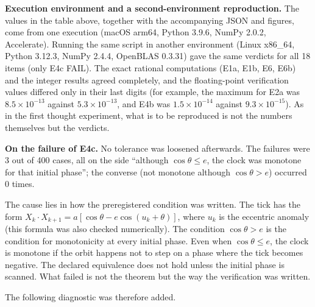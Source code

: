 \documentclass[
  a4paper,
]{article}
\begin{document}
\textbf{Execution environment and a second-environment reproduction.}
The values in the table above, together with the accompanying JSON and
figures, come from one execution (macOS arm64, Python 3.9.6, NumPy
2.0.2, Accelerate). Running the same script in another environment
(Linux x86\_64, Python 3.12.3, NumPy 2.4.4, OpenBLAS 0.3.31) gave the
same verdicts for all 18 items (only E4c FAIL). The exact rational
computations (E1a, E1b, E6, E6b) and the integer results agreed
completely, and the floating-point verification values differed only in
their last digits (for example, the maximum for E2a was
\(8.5\times10^{-13}\) against \(5.3\times10^{-13}\), and E4b was
\(1.5\times10^{-14}\) against \(9.3\times10^{-15}\)). As in the first
thought experiment, what is to be reproduced is not the numbers
themselves but the verdicts.

\textbf{On the failure of E4c.} No tolerance was loosened afterwards.
The failures were 3 out of 400 cases, all on the side ``although
\(\cos\theta\le e\), the clock was monotone for that initial phase'';
the converse (not monotone although \(\cos\theta>e\)) occurred 0 times.

The cause lies in how the preregistered condition was written. The tick
has the form \(X_k\cdot X_{k+1}=a[\cos\theta-e\cos(u_k+\theta)]\), where
\(u_k\) is the eccentric anomaly (this formula was also checked
numerically). The condition \(\cos\theta>e\) is the condition for
monotonicity at every initial phase. Even when \(\cos\theta\le e\), the
clock is monotone if the orbit happens not to step on a phase where the
tick becomes negative. The declared equivalence does not hold unless the
initial phase is scanned. What failed is not the theorem but the way the
verification was written.

The following diagnostic was therefore added.
\end{document}
